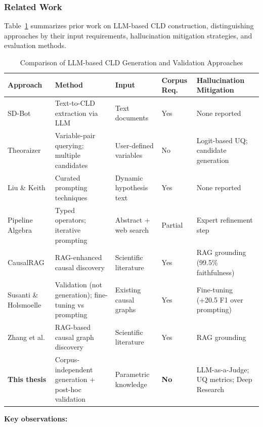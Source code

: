\documentclass[12pt]{article}
\begin{document}
\subsubsection{Related Work}

Table~\ref{tab:prior_cld_work} summarizes prior work on LLM-based CLD construction, distinguishing approaches by their input requirements, hallucination mitigation strategies, and evaluation methods.

\begin{table}[htbp]
\centering
\caption{Comparison of LLM-based CLD Generation and Validation Approaches}
\label{tab:prior_cld_work}
\small
\begin{tabular}{p{2.2cm}p{2.5cm}p{2.2cm}p{2.0cm}p{3.5cm}}
\hline
\textbf{Approach} & \textbf{Method} & \textbf{Input} & \textbf{Corpus Req.} & \textbf{Hallucination Mitigation} \\
\hline
SD-Bot \cite{hosseinichimeh2024textmapdynamicsbot} & Text-to-CLD extraction via LLM & Text documents & Yes & None reported \\
\hline
Theoraizer \cite{Waaijers2024theoraizer} & Variable-pair querying; multiple candidates & User-defined variables & No & Logit-based UQ; candidate generation \\
\hline
Liu \& Keith \cite{liu2025leveraging} & Curated prompting techniques & Dynamic hypothesis text & Yes & None reported \\
\hline
Pipeline Algebra \cite{reinholtz2025pipelinealgebra} & Typed operators; iterative prompting & Abstract + web search & Partial & Expert refinement step \\
\hline
CausalRAG \cite{wang2025causalrag} & RAG-enhanced causal discovery & Scientific literature & Yes & RAG grounding (99.5\% faithfulness) \\
\hline
Susanti \& Holsmoelle \cite{susanti2025prompting} & Validation (not generation); fine-tuning vs prompting & Existing causal graphs & Yes & Fine-tuning (+20.5 F1 over prompting) \\
\hline
Zhang et al. \cite{zhang2024causal} & RAG-based causal graph discovery & Scientific literature & Yes & RAG grounding \\
\hline
\textbf{This thesis} & Corpus-independent generation + post-hoc validation & Parametric knowledge & \textbf{No} & LLM-as-a-Judge; UQ metrics; Deep Research \\
\hline
\end{tabular}
\end{table}

\noindent\textbf{Key observations:}
\end{document}
